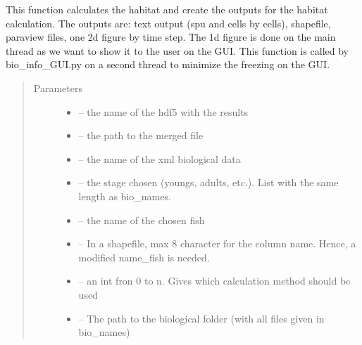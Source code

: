 \documentclass[letterpaper,10pt,english]{sphinxmanual}
\begin{document}

\begin{fulllineitems}
\label{\detokenize{index:src.calcul_hab.calc_hab_and_output}}
This function calculates the habitat and create the outputs for the habitat calculation. The outputs are: text
output (spu and cells by cells), shapefile, paraview files, one 2d figure by time step. The 1d figure
is done on the main thread as we want to show it to the user on the GUI. This function is called by bio\_info\_GUI.py
on a second thread to minimize the freezing on the GUI.
\begin{quote}\begin{description}
\item[{Parameters}] \leavevmode\begin{itemize}
\item {} 
 -- the name of the hdf5 with the results

\item {} 
 -- the path to the merged file

\item {} 
 -- the name of the xml biological data

\item {} 
 -- the stage chosen (youngs, adults, etc.). List with the same length as bio\_names.

\item {} 
 -- the name of the chosen fish

\item {} 
 -- In a shapefile, max 8 character for the column name. Hence, a modified name\_fish is needed.

\item {} 
 -- an int fron 0 to n. Gives which calculation method should be used

\item {} 
 -- The path to the biological folder (with all files given in bio\_names)


\end{itemize}
\end{description}
\end{quote}
\end{fulllineitems}
\end{document}
